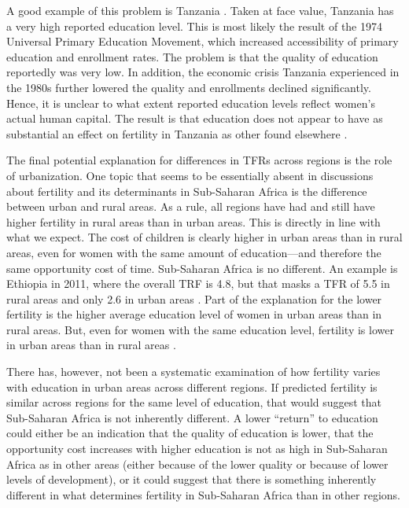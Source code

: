 \documentclass[letterpaper,12pt]{article}
\begin{document}
A good example of this problem is Tanzania
\citep{Galabawa2001,Wedgwood2005}.
Taken at face value, Tanzania has a very high reported education level.
This is most likely the result of the 1974 Universal Primary Education
Movement, which increased accessibility of primary education and
enrollment rates.
The problem is that the quality of education reportedly was very low.
In addition, the economic crisis Tanzania experienced in the 1980s
further lowered the quality and enrollments declined significantly.
Hence, it is unclear to what extent reported education levels reflect
women's actual human capital.
The result is that education does not appear to have as substantial an
effect on fertility in Tanzania as other found elsewhere
\citep{Alam2016}.



The final potential explanation for differences in TFRs across regions 
is the role of urbanization.
One topic that seems to be essentially absent in discussions about
fertility and its determinants in Sub-Saharan Africa is the difference
between urban and rural areas.
As a rule, all regions have had and still have higher fertility in rural
areas than in urban areas.
This is directly in line with what we expect.
The cost of children is clearly higher in urban areas than in rural
areas, even for women with the same amount of education---and therefore
the same opportunity cost of time.
Sub-Saharan Africa is no different.
An example is Ethiopia in 2011, where the overall TRF is 4.8, but that
masks a TFR of 5.5 in rural areas and only 2.6 in urban areas
\citep{Central-Statistical-Agency/Ethiopia2012}.
Part of the explanation for the lower fertility is the higher average
education level of women in urban areas than in rural areas.
But, even for women with the same education level, fertility is lower in
urban areas than in rural areas \citep{Ainsworth1996}.

There has, however, not been a systematic examination of how fertility
varies with education in urban areas across different regions.
If predicted fertility is similar across regions for the same level of
education, that would suggest that Sub-Saharan Africa is not inherently
different.
A lower ``return'' to education could either be an indication that the
quality of education is lower, that the opportunity cost increases with
higher education is not as high in Sub-Saharan Africa as in other areas
(either because of the lower quality or because of lower levels of
development), or it could suggest that there is something inherently
different in what determines fertility in Sub-Saharan Africa than in
other regions.
\end{document}
